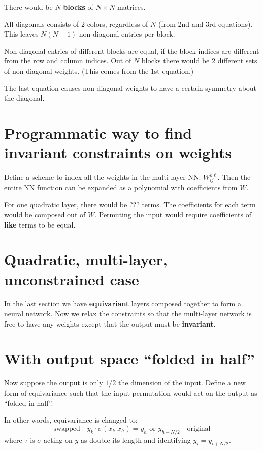 There would be $N$ \textbf{blocks} of $N \times N$ matrices.

All diagonals consists of 2 colors, regardless of $N$ (from 2nd and 3rd equations).  This leaves $N (N - 1)$ non-diagonal entries per block.

Non-diagonal entries of different blocks are equal, if the block indices are different from the row and column indices.  Out of $N$ blocks there would be 2 different sets of non-diagonal weights.  (This comes from the 1st equation.)

The last equation causes non-diagonal weights to have a certain symmetry about the diagonal.  

\section{Programmatic way to find invariant constraints on weights}

Define a scheme to index all the weights in the multi-layer NN: $W_{ij}^{k \ell}$.  Then the entire NN function can be expanded as a polynomial with coefficients from $W$.

For one quadratic layer, there would be ??? terms.  The coefficients for each term would be composed out of $W$.  Permuting the input would require coefficients of \textbf{like} terms to be equal.


\section{Quadratic, multi-layer, unconstrained case}

In the last section we have \textbf{equivariant} layers composed together to form a neural network.  Now we relax the constraints so that the multi-layer network is free to have any weights except that the output must be \textbf{invariant}.




\section{With output space ``folded in half''}

Now suppose the output is only $1/2$ the dimension of the input.  Define a new form of equivariance such that the input permutation would act on the output as ``folded in half''. 

In other words, equivariance is changed to:
\begin{equation}
\boxed{\mbox{swapped}} \quad y_k \cdot \sigma(x_k \; x_h) = y_h \mbox{  or  } y_{h-N/2} \quad \boxed{\mbox{original}} \end{equation}
where $\tau$ is $\sigma$ acting on $y$ as double its length and identifying $y_i = y_{i + N/2}$.

